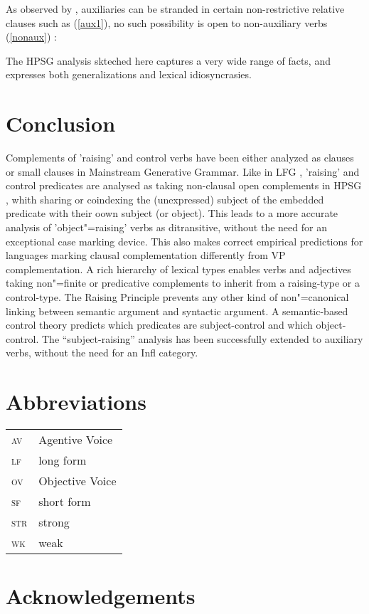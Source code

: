 \documentclass[output=paper
	        ,collection
	        ,collectionchapter
 	        ,biblatex
                ,babelshorthands
                ,newtxmath
                ,draftmode
                ,colorlinks, citecolor=brown
]{./langsci/langscibook}
\begin{document}
As observed by \citet{ArnoldandBorsley2008}, auxiliaries can be stranded in certain non-restrictive relative clauses such as (\ref{aux1}), no such possibility is open to non-auxiliary verbs (\ref{nonaux}) :

\eal
{}
\zl

The HPSG analysis skteched here captures a very wide range of facts, and expresses both generalizations and lexical idiosyncrasies.


	
\section{Conclusion}
Complements of 'raising' and control verbs have been either analyzed as clauses \citep{Chomsky81a} or small clauses \citep{Stowell81a-u,Stowell1983} in Mainstream Generative Grammar.
Like in LFG \citep{Bresnan1982}, 'raising' and control predicates are analysed as taking non-clausal open complements in HPSG \citep{PollardandSag1994}, whith sharing or coindexing the (unexpressed) subject of the embedded predicate with their oown subject (or object). This leads to a more accurate analysis of 'object"=raising' verbs as ditransitive, without the need for an exceptional case marking device. This also makes correct empirical predictions for languages marking clausal complementation differently from VP complementation. A rich hierarchy of lexical types enables verbs and adjectives taking non"=finite or predicative complements to inherit from a raising-type or a control-type. The Raising Principle prevents any other kind of non"=canonical linking between semantic argument and syntactic argument. A semantic-based control theory predicts which predicates are subject-control and which object-control. The ``subject-raising'' analysis has been successfully extended to auxiliary verbs, without the need for an Infl category.




\section*{Abbreviations}

\begin{tabularx}{.45\textwidth}{lX}
\textsc{av} & Agentive Voice\\
\textsc{lf} & long form\\ 
\textsc{ov} & Objective Voice\\
\textsc{sf} & short form\\
\textsc{str} & strong\\
\textsc{wk} & weak\\

\end{tabularx}

\section*{Acknowledgements}

{\sloppy
\printbibliography[heading=subbibliography,notkeyword=this] 
}
\end{document}
